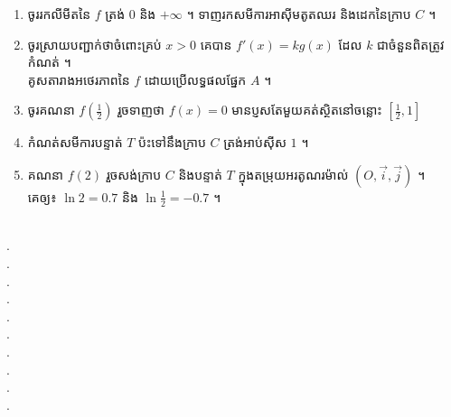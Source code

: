\documentclass{officialexam}
\begin{document}
\begin{enumerate}[I]
	\begin{enumerate}[k]
		\item ចូររកលីមីតនៃ $f$ ត្រង់ $0$ និង $+\infty$ ។ ទាញរកសមីការអាស៊ីមតូតឈរ និងដេកនៃក្រាប $C$ ។
		\item ចូរស្រាយបញ្ជាក់ថាចំពោះគ្រប់ $x>0$ គេបាន $f'(x)=kg(x)$ ដែល $k$ ជាចំនួនពិតត្រូវកំណត់ ។​\\ គូសតារាងអថេរភាពនៃ $f$ ដោយប្រើលទ្ធផលផ្នែក $A$ ។
		\item ចូរគណនា $f\left(\frac{1}{2}\right)$ រួចទាញថា $f(x)=0$ មានប្ញសតែមួយគត់ស្ថិតនៅចន្លោះ $\left[\frac{1}{2},1\right]$
		\item កំណត់សមីការបន្ទាត់ $T$ ប៉ះទៅនឹងក្រាប $C$ ត្រង់អាប់ស៊ីស $1$ ។
		\item គណនា $f(2)$ រួចសង់ក្រាប $C$ និងបន្ទាត់ $T$ ក្នុងតម្រុយអរតូណរម៉ាល់ $(O,\vec{i}, \vec{j})$ ។\\
		គេឲ្យ៖ $\ln2=0.7 $ និង $\ln\frac{1}{2}=-0.7$ ។
	\end{enumerate}
\end{enumerate}
\borderline{\bigg[ចម្លើយ\bigg]}\\
{\color{white}.}\dotfill\\
{\color{white}.}\dotfill\\
{\color{white}.}\dotfill\\
{\color{white}.}\dotfill\\
{\color{white}.}\dotfill\\
{\color{white}.}\dotfill\\
{\color{white}.}\dotfill\\
{\color{white}.}\dotfill\\
{\color{white}.}\dotfill\\
{\color{white}.}\dotfill
\end{document}
